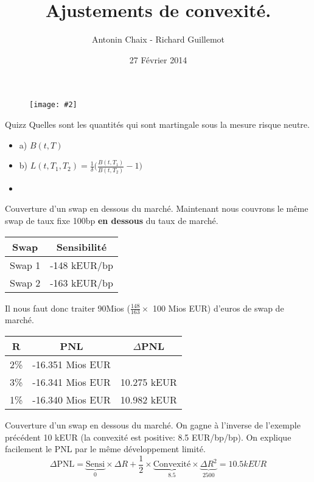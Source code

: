 \documentclass{beamer}
\title[Produits dérivés de taux]{Ajustements de convexité. }
\author{Antonin Chaix - Richard Guillemot}
\institute{Master IFMA}
\date{27 Février 2014}
\newcommand{\FIG}[2]{\texttt{[image: \#2]}}
\begin{document}
\begin{frame}
\titlepage
\begin{figure}[h]
\centering \FIG{5cm}{figures/UPMC_IFMA.jpg}
\end{figure}
\end{frame}

\begin{frame}{Quizz}
Quelles sont les quantités qui sont martingale sous la mesure risque neutre.
\begin{itemize}
\item a) $B(t,T)$
\item b) $L(t,T_1,T_2)=\frac{1}{\delta}\big(\frac{B(t,T_1)}{B(t,T_2)}-1 \big)$
\item
\end{itemize}
\end{frame}

\begin{frame}{Couverture d'un swap en dessous du marché.}
Maintenant nous couvrons le même swap de taux fixe 100bp \textbf{en dessous} du taux de marché.\\
\begin{center}
\begin{tabular}{|c|c|}
\hline
Swap&Sensibilité \\ 
\hline
Swap 1 &-148 kEUR/bp \\ 
Swap 2 &-163 kEUR/bp \\ 
\hline
\end{tabular}
\end{center}
Il nous faut donc traiter 90Mios ($\frac{148}{163} \times$ 100 Mios EUR)  d'euros de swap de marché. 
\begin{center}
\begin{tabular}{|c|c|c|}
\hline
R&PNL&$\Delta$PNL \\ 
\hline
2\% &-16.351 Mios EUR& \\ 
3\% &-16.341 Mios EUR&10.275 kEUR\\ 
1\% &-16.340 Mios EUR&10.982 kEUR\\ 
\hline
\end{tabular}
\end{center}
\end{frame}
\begin{frame}{Couverture d'un swap en dessous du marché.}
On gagne à l'inverse de l'exemple précédent 10 kEUR (la convexité est positive: 8.5 EUR/bp/bp).
On explique facilement le PNL par le même développement limité.
\[
\Delta \text{PNL}=\underbrace{\text{Sensi}}_{0} \times \Delta R + \frac{1}{2} \times \underbrace{\text{Convexité}}_{8.5} \times \underbrace{\Delta R^2}_{2500}=10.5 kEUR
\]
\end{frame}
\end{document}
